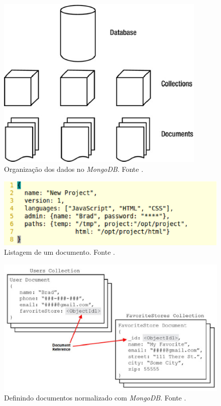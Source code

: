 \begin{figure}[ht]
	\centering
	\includegraphics[width=10cm]{figuras/mongodb.eps}
	\caption{Organização dos dados no \emph{MongoDB}. Fonte \cite{Plugge2014}.}
	\label{mongodb}
\end{figure}

\begin{figure}[ht]
	\centering
	\includegraphics[width=12cm]{figuras/listagem1.eps}
	\caption{Listagem de um documento. Fonte \cite{Dayley2014}.}
	\label{listagem1}
\end{figure}

\begin{figure}[ht]
	\centering
	\includegraphics[width=12cm]{figuras/normalizacao.eps}
	\caption{Definindo documentos normalizado com \emph{MongoDB}. Fonte \cite{Dayley2014}.}
	\label{normalizacao}
\end{figure}
